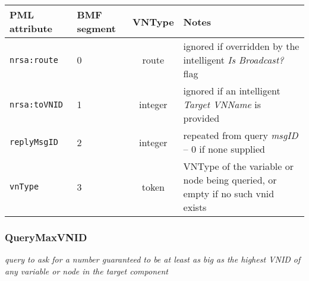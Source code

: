 \documentclass[pdftex,a4paper]{article}
\newcommand{\XMLfont}[1]{{\tt \small #1}}
\begin{document}
\begin{table}[!h]
  \begin{center}
    \label{tab:ReplyVNType}
    \begin{tabular}{|l|p{13mm}|c|p{60mm}|}
      \hline

      \textbf{PML attribute} & \textbf{BMF segment} & \textbf{VNType}
      & \textbf{Notes} \\\hline

      \XMLfont{nrsa:route} & 0 & route & ignored if overridden by the
      intelligent {\em Is Broadcast?} flag \\ \hline

      \XMLfont{nrsa:toVNID} & 1 & integer & ignored if an intelligent {\em
      Target VNName} is provided \\\hline

      \XMLfont{replyMsgID} & 2 & integer & repeated from query {\em
      msgID} -- 0 if none supplied \\\hline

      \XMLfont{vnType} & 3 & token & VNType of the variable or
      node being queried, or empty if no such vnid exists \\\hline

    \end{tabular}
  \end{center}
\end{table}

\clearpage

\subsubsection{QueryMaxVNID}

{\em query to ask for a number guaranteed to be at
  least as big as the highest VNID of any variable or node in the
  target component}
\end{document}
